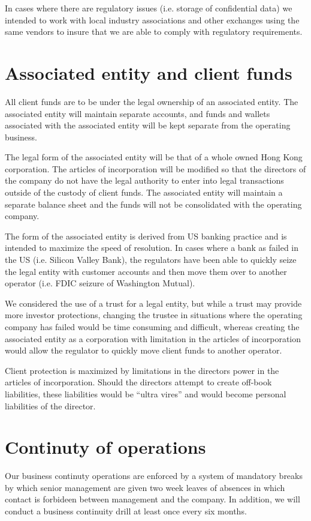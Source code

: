 In cases where there are regulatory issues (i.e. storage of
confidential data) we intended to work with local industry
associations and other exchanges using the same vendors to insure that
we are able to comply with regulatory requirements.

\section{Associated entity and client funds}
All client funds are to be under the legal ownership of an associated
entity.  The associated entity will maintain separate accounts, and
funds and wallets associated with the associated entity will be kept
separate from the operating business.

The legal form of the associated entity will be that of a whole owned
Hong Kong corporation.  The articles of incorporation will be modified
so that the directors of the company do not have the legal authority
to enter into legal transactions outside of the custody of client
funds.  The associated entity will maintain a separate balance sheet
and the funds will not be consolidated with the operating company.

The form of the associated entity is derived from US banking practice
and is intended to maximize the speed of resolution.  In cases where a
bank as failed in the US (i.e. Silicon Valley Bank), the regulators
have been able to quickly seize the legal entity with customer
accounts and then move them over to another operator (i.e. FDIC
seizure of Washington Mutual).

We considered the use of a trust for a legal entity, but while a trust
may provide more investor protections, changing the trustee in
situations where the operating company has failed would be time
consuming and difficult, whereas creating the associated entity as a
corporation with limitation in the articles of incorporation would
allow the regulator to quickly move client funds to another operator.

Client protection is maximized by limitations in the directors power
in the articles of incorporation.  Should the directors attempt to
create off-book liabilities, these liabilities would be ``ultra
vires'' and would become personal liabilities of the director.

\section{Continuty of operations}
Our business continuty operations are enforced by a system of
mandatory breaks by which senior management are given two week leaves
of absences in which contact is forbideen between management and the
company.  In addition, we will conduct a business continuity drill at
least once every six months.

